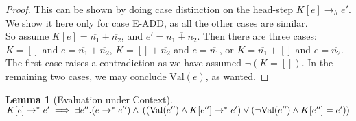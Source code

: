 \documentclass[twoside,11pt,openright]{report}
\newtheorem{lemma}[theorem]{Lemma}
\theoremstyle{definition}
\newcommand{\expr}{e}
\newcommand{\Num}[1]{\overline{#1}}
\newcommand{\empelctx}{[]}
\newcommand{\elctx}{K}
\newcommand{\stepS}{\rightarrow^*}
\newcommand{\hstep}{\rightarrow_h}
\newcommand{\Val}[1]{\mathrm{Val}(#1)}
\begin{document}
\begin{proof}
  This can be shown by doing case distinction on the head-step $\elctx[\expr] \hstep \expr'$. We show it here only for case E-ADD, as all the other cases are similar. \medskip\\
  So assume $\elctx[\expr] = \Num{n_1} + \Num{n_2}$, and $\expr' = \Num{n_1 + n_2}$.
  Then there are three cases: $\elctx = []$ and $\expr = \Num{n_1} + \Num{n_2}$, $\elctx = [] + \Num{n_2}$ and $\expr = \Num{n_1}$, or $\elctx = \Num{n_1} + []$ and $\expr = \Num{n_2}$. The first case raises a contradiction as we have assumed $\neg (\elctx = \empelctx)$. In the remaining two cases, we may conclude $\Val{\expr}$, as wanted.
\end{proof}


\begin{lemma}[Evaluation under Context]\label{lem:EuC}
  $ \elctx[\expr] \stepS \expr' \implies 
    \exists \expr'' . (\expr \stepS \expr'') \land\\
    \left( (\Val{\expr''} \land \elctx[\expr''] \stepS \expr') \lor
    (\neg \Val{\expr''} \land \elctx[\expr''] = \expr') \right)
    $
\end{lemma}
\end{document}
